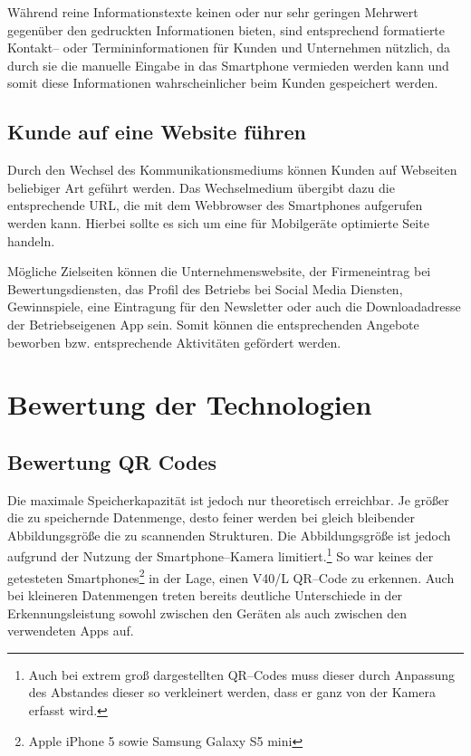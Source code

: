 Während reine Informationstexte keinen oder nur sehr geringen Mehrwert gegenüber den gedruckten Informationen bieten, sind entsprechend formatierte Kontakt– oder Termininformationen für Kunden und Unternehmen nützlich, da durch sie die manuelle Eingabe in das Smartphone vermieden werden kann und somit diese Informationen wahrscheinlicher beim Kunden gespeichert werden.

\subsection{Kunde auf eine Website führen} %
\label{sub:kunde_auf_eine_website_fuhren}
Durch den Wechsel des Kommunikationsmediums können Kunden auf Webseiten beliebiger Art geführt werden. Das Wechselmedium übergibt dazu die entsprechende \ac{URL}, die mit dem Webbrowser des Smartphones aufgerufen werden kann. Hierbei sollte es sich um eine für Mobilgeräte optimierte Seite handeln.

Mögliche Zielseiten können die Unternehmenswebsite, der Firmeneintrag bei Bewertungsdiensten, das Profil des Betriebs bei Social Media Diensten, Gewinnspiele, eine Eintragung für den Newsletter oder auch die Downloadadresse der Betriebseigenen App sein. Somit können die entsprechenden Angebote beworben bzw. entsprechende Aktivitäten gefördert werden.


\newpage
\section{Bewertung der Technologien} %
\label{sec:bewertung}

\subsection{Bewertung QR Codes} %
\label{sub:bewertung_qr_codes}
Die maximale Speicherkapazität ist jedoch nur theoretisch erreichbar. Je größer die zu speichernde Datenmenge, desto feiner werden bei gleich bleibender Abbildungsgröße die zu scannenden Strukturen. Die Abbildungsgröße ist jedoch aufgrund der Nutzung der Smartphone–Kamera limitiert.\footnote{Auch bei extrem groß dargestellten QR–Codes muss dieser durch Anpassung des Abstandes dieser so verkleinert werden, dass er ganz von der Kamera erfasst wird.} So war keines der getesteten Smartphones\footnote{Apple iPhone 5 sowie Samsung Galaxy S5 mini} in der Lage, einen V40/L QR–Code zu erkennen. Auch bei kleineren Datenmengen treten bereits deutliche Unterschiede in der Erkennungsleistung sowohl zwischen den Geräten als auch zwischen den verwendeten Apps auf.

